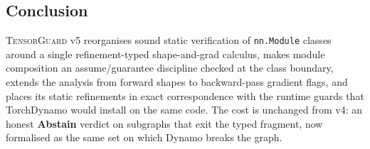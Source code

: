 \subsection{Conclusion}\label{sec:conclusion}

\textsc{TensorGuard} v5 reorganises sound static verification of
\verb|nn.Module| classes around a single refinement-typed
shape-and-grad calculus, makes module composition an
assume/guarantee discipline checked at the class boundary,
extends the analysis from forward shapes to backward-pass
gradient flags, and places its static refinements in exact
correspondence with the runtime guards that TorchDynamo would
install on the same code. The cost is unchanged from v4: an
honest \textbf{Abstain} verdict on subgraphs that exit the typed
fragment, now formalised as the same set on which Dynamo breaks
the graph.
